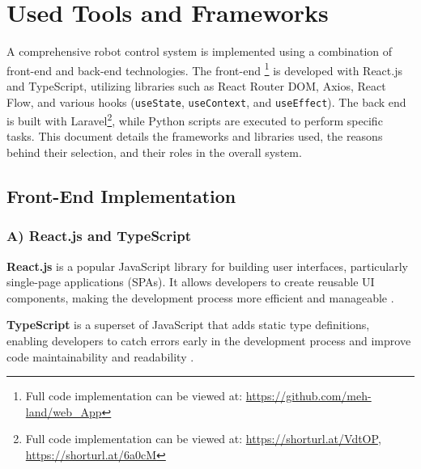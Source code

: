 \section{Used Tools and Frameworks} %
A comprehensive robot control system is implemented using a combination of front-end  and back-end  technologies. The front-end \footnote{Full code implementation can be viewed at: \url{https://github.com/meh-land/web\_App}} is developed with React.js and TypeScript, utilizing libraries such as React Router DOM, Axios, React Flow, and various hooks (\texttt{useState}, \texttt{useContext}, and \texttt{useEffect}). The back end is built with Laravel\footnote{Full code implementation can be viewed at: \url{https://shorturl.at/VdtOP}, \url{https://shorturl.at/6a0cM}}, while Python scripts are executed to perform specific tasks. This document details the frameworks and libraries used, the reasons behind their selection, and their roles in the overall system.

\subsection{Front-End Implementation}
\subsubsection{A) React.js and TypeScript}

\textbf{React.js} is a popular JavaScript library for building user interfaces, particularly single-page applications (SPAs). It allows developers to create reusable UI components, making the development process more efficient and manageable \cite{reactjs}. 

\textbf{TypeScript} is a superset of JavaScript that adds static type definitions, enabling developers to catch errors early in the development process and improve code maintainability and readability \cite{reactTS}.


